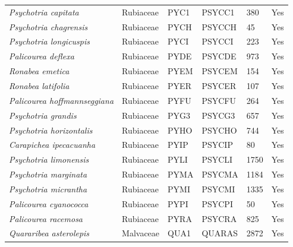 \documentclass[11pt]{article}
\begin{document}
\begin{longtable}{@{}llllll@{}}
\textit{Psychotria capitata}                          & Rubiaceae        & PYC1   & PSYCC1 & 380             & Yes       \\
\textit{Psychotria chagrensis}                        & Rubiaceae        & PYCH   & PSYCCH & 45              & Yes       \\
\textit{Psychotria longicuspis}                       & Rubiaceae        & PYCI   & PSYCCI & 223             & Yes       \\
\textit{Palicourea deflexa}                           & Rubiaceae        & PYDE   & PSYCDE & 973             & Yes       \\
\textit{Ronabea emetica}                              & Rubiaceae        & PYEM   & PSYCEM & 154             & Yes       \\
\textit{Ronabea latifolia}                            & Rubiaceae        & PYER   & PSYCER & 107             & Yes       \\
\textit{Palicourea hoffmannseggiana}                  & Rubiaceae        & PYFU   & PSYCFU & 264             & Yes       \\
\textit{Psychotria grandis}                           & Rubiaceae        & PYG3   & PSYCG3 & 657             & Yes       \\
\textit{Psychotria horizontalis}                      & Rubiaceae        & PYHO   & PSYCHO & 744             & Yes       \\
\textit{Carapichea ipecacuanha}                       & Rubiaceae        & PYIP   & PSYCIP & 80              & Yes       \\
\textit{Psychotria limonensis}                        & Rubiaceae        & PYLI   & PSYCLI & 1750            & Yes       \\
\textit{Psychotria marginata}                         & Rubiaceae        & PYMA   & PSYCMA & 1184            & Yes       \\
\textit{Psychotria micrantha}                         & Rubiaceae        & PYMI   & PSYCMI & 1335            & Yes       \\
\textit{Palicourea cyanococca}                        & Rubiaceae        & PYPI   & PSYCPI & 50              & Yes       \\
\textit{Palicourea racemosa}                          & Rubiaceae        & PYRA   & PSYCRA & 825             & Yes       \\
\textit{Quararibea asterolepis}                       & Malvaceae        & QUA1   & QUARAS & 2872            & Yes       \\

\end{longtable}
\end{document}
